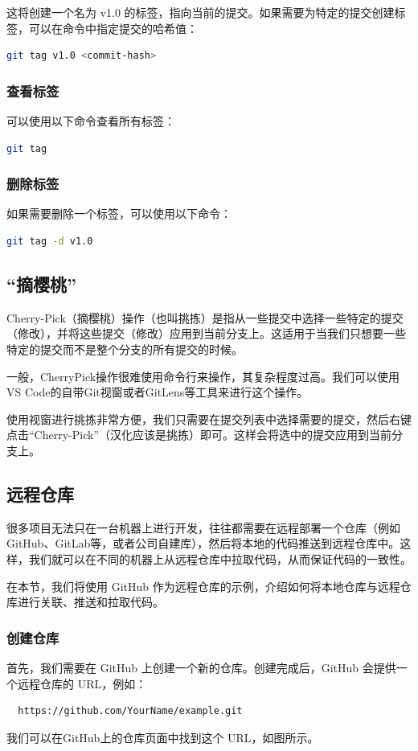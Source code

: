\documentclass[../main.tex]{subfiles}
\begin{document}
这将创建一个名为 v1.0 的标签，指向当前的提交。如果需要为特定的提交创建标签，可以在命令中指定提交的哈希值：
\begin{lstlisting}[language=bash]
git tag v1.0 <commit-hash>
\end{lstlisting}

\subsubsection{查看标签}
可以使用以下命令查看所有标签：
\begin{lstlisting}[language=bash]
git tag
\end{lstlisting}

\subsubsection{删除标签}
如果需要删除一个标签，可以使用以下命令：
\begin{lstlisting}[language=bash]
git tag -d v1.0
\end{lstlisting}

\subsection{“摘樱桃”}

Cherry-Pick（摘樱桃）操作（也叫挑拣）是指从一些提交中选择一些特定的提交（修改），并将这些提交（修改）应用到当前分支上。这适用于当我们只想要一些特定的提交而不是整个分支的所有提交的时候。

一般，CherryPick操作很难使用命令行来操作，其复杂程度过高。我们可以使用VS Code的自带Git视窗或者GitLens等工具来进行这个操作。

使用视窗进行挑拣非常方便，我们只需要在提交列表中选择需要的提交，然后右键点击“Cherry-Pick”（汉化应该是挑拣）即可。这样会将选中的提交应用到当前分支上。

\subsection{远程仓库}

很多项目无法只在一台机器上进行开发，往往都需要在远程部署一个仓库（例如GitHub、GitLab等，或者公司自建库），然后将本地的代码推送到远程仓库中。这样，我们就可以在不同的机器上从远程仓库中拉取代码，从而保证代码的一致性。

在本节，我们将使用 GitHub 作为远程仓库的示例，介绍如何将本地仓库与远程仓库进行关联、推送和拉取代码。

\subsubsection{创建仓库}
首先，我们需要在 GitHub 上创建一个新的仓库。创建完成后，GitHub 会提供一个远程仓库的 URL，例如：
\begin{lstlisting}
  https://github.com/YourName/example.git
\end{lstlisting}
我们可以在GitHub上的仓库页面中找到这个 URL，如图所示。
\end{document}
